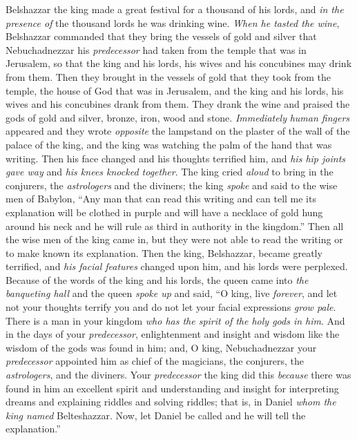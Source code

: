 \begin{biblechapter} %
 Belshazzar the king made a great festival for a thousand of his lords, and \textit{in the presence of} the thousand lords he was drinking wine.
\verse \textit{When he tasted the wine}, Belshazzar commanded that they bring the vessels of gold and silver that Nebuchadnezzar his \textit{predecessor} had taken from the temple that was in Jerusalem, so that the king and his lords, his wives and his concubines may drink from them.
\verse Then they brought in the vessels of gold that they took from the temple, the house of God that was in Jerusalem, and the king and his lords, his wives and his concubines drank from them.
\verse They drank the wine and praised the gods of gold and silver, bronze, iron, wood and stone.
\verse \textit{Immediately} \textit{human fingers} appeared and they wrote \textit{opposite} the lampstand on the plaster of the wall of the palace of the king, and the king was watching the palm of the hand that was writing.
\verse Then his face changed and his thoughts terrified him, and \textit{his hip joints gave way} and \textit{his knees knocked together}.
\verse The king cried \textit{aloud} to bring in the conjurers, the \textit{astrologers} and the diviners; the king \textit{spoke} and said to the wise men of Babylon, “Any man that can read this writing and can tell me its explanation will be clothed in purple and will have a necklace of gold hung around his neck and he will rule as third in authority in the kingdom.”
\verse Then all the wise men of the king came in, but they were not able to read the writing or to make known its explanation.
\verse Then the king, Belshazzar, became greatly terrified, and \textit{his facial features} changed upon him, and his lords were perplexed.
\verse Because of the words of the king and his lords, the queen came into \textit{the banqueting hall} and the queen \textit{spoke up} and said, “O king, live \textit{forever}, and let not your thoughts terrify you and do not let your facial expressions \textit{grow pale}.
\verse There is a man in your kingdom \textit{who has the spirit of the holy gods in him}. And in the days of your \textit{predecessor}, enlightenment and insight and wisdom like the wisdom of the gods was found in him; and, O king, Nebuchadnezzar your \textit{predecessor} appointed him as chief of the magicians, the conjurers, the \textit{astrologers}, and the diviners. Your \textit{predecessor} the king did this
\verse \textit{because} there was found in him an excellent spirit and understanding and insight for interpreting dreams and explaining riddles and solving riddles; that is, in Daniel \textit{whom the king named} Belteshazzar. Now, let Daniel be called and he will tell the explanation.”

\end{biblechapter}

